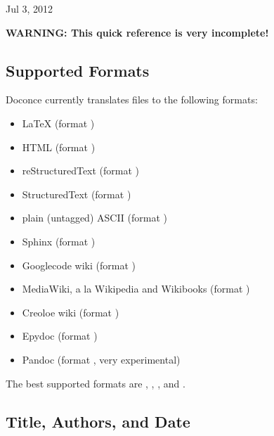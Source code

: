 \documentclass{book}
\begin{document}

\begin{center}
Jul 3, 2012
\end{center}



\textbf{WARNING: This quick reference is very incomplete!}

\subsection{Supported Formats}

Doconce currently translates files to the following formats:

\begin{itemize}
 \item {\LaTeX} (format )

 \item HTML (format )

 \item reStructuredText (format )

 \item StructuredText (format )

 \item plain (untagged) ASCII (format )

 \item Sphinx (format )

 \item Googlecode wiki (format )

 \item MediaWiki, a la Wikipedia and Wikibooks (format )

 \item Creoloe wiki (format )

 \item Epydoc (format )

 \item Pandoc (format , very experimental)
\end{itemize}

\noindent
The best supported formats are , , , and .

\subsection{Title, Authors, and Date}
\end{document}
